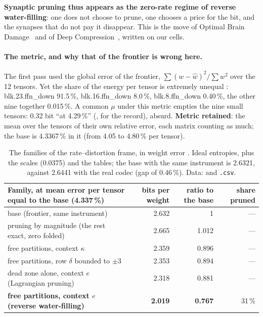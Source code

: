 \textbf{Synaptic pruning thus appears as the zero-rate regime of reverse water-filling}: one does not choose to prune, one chooses a price for the bit, and the synapses that do not pay it disappear. This is the move of Optimal Brain Damage~\cite{lecun1989obd} and of Deep Compression~\cite{han2015deepcompression}, written on our cells.

\paragraph{The metric, and why that of the frontier is wrong here.} The first pass used the global error of the frontier, $\sum (w - \hat w)^2 / \sum w^2$ over the 12 tensors. Yet the share of the energy per tensor is extremely unequal \mes: blk.23.ffn\_down 91.5\,\%, blk.16.ffn\_down 8.0\,\%, blk.8.ffn\_down 0.40\,\%, the other nine together 0.015\,\%. A common $\mu$ under this metric empties the nine small tensors: 0.32 bit ``at 4.29\,\%'' (, for the record), absurd. \textbf{Metric retained}: the mean over the tensors of their own relative error, each matrix counting as much; the base is 4.3367\,\% in it (from 4.05 to 4.80\,\% per tensor).

\begin{table}[tbp]
\centering\footnotesize\setlength{\tabcolsep}{3pt}
\begin{tabularx}{\linewidth}{@{}>{\raggedright\arraybackslash}X r r r@{}}
\toprule
Family, at mean error per tensor equal to the base (4.337\,\%) & bits per weight & ratio to the base & share pruned \\
\midrule
base (frontier, same instrument) & 2.632 & 1 & --- \\
pruning by magnitude (the rest exact, zero folded) & 2.665 & 1.012 & --- \\
free partitions, context $\kappa$ & 2.359 & 0.896 & --- \\
free partitions, row $\delta$ bounded to $\pm 3$ & 2.353 & 0.894 & --- \\
dead zone alone, context $e$ (Lagrangian pruning) & 2.318 & 0.881 & --- \\
\textbf{free partitions, context $e$ (reverse water-filling)} & \textbf{2.019} & \textbf{0.767} & 31\,\% \\
\bottomrule
\end{tabularx}
\caption[The rate--distortion frame, in weight error]{The families of the rate--distortion frame, in weight error \mes. Ideal entropies, plus the scales (0.0375) and the tables; the base with the same instrument is 2.6321, against 2.6441 with the real codec (gap of 0.46\,\%). Data:  and \texttt{.csv}.}
\label{t3pre:tab:rd}
\end{table}

